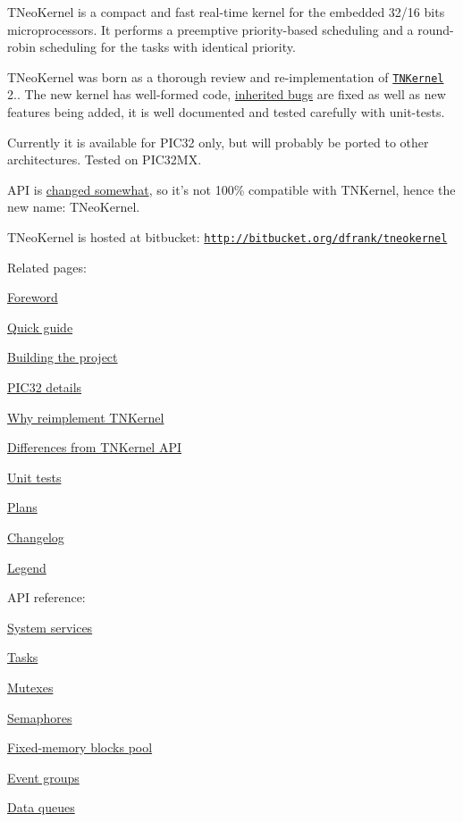 T\+Neo\+Kernel is a compact and fast real-\/time kernel for the embedded 32/16 bits microprocessors. It performs a preemptive priority-\/based scheduling and a round-\/robin scheduling for the tasks with identical priority.

T\+Neo\+Kernel was born as a thorough review and re-\/implementation of \href{http://tnkernel.com}{\tt T\+N\+Kernel} 2.. The new kernel has well-\/formed code, \hyperlink{why_reimplement_why_reimplement__bugs}{inherited bugs} are fixed as well as new features being added, it is well documented and tested carefully with unit-\/tests.

Currently it is available for P\+I\+C32 only, but will probably be ported to other architectures. Tested on P\+I\+C32\+M\+X.

A\+P\+I is \hyperlink{tnkernel_diff}{changed somewhat}, so it's not 100\% compatible with T\+N\+Kernel, hence the new name\+: T\+Neo\+Kernel.

T\+Neo\+Kernel is hosted at bitbucket\+: \href{http://bitbucket.org/dfrank/tneokernel}{\tt http\+://bitbucket.\+org/dfrank/tneokernel}

Related pages\+:


\begin{DoxyItemize}
\item \hyperlink{foreword}{Foreword}
\item \hyperlink{quick_guide}{Quick guide}
\item \hyperlink{building}{Building the project}
\item \hyperlink{pic32_details}{P\+I\+C32 details}
\item \hyperlink{why_reimplement}{Why reimplement T\+N\+Kernel}
\item \hyperlink{tnkernel_diff}{Differences from T\+N\+Kernel A\+P\+I}
\item \hyperlink{unit_tests}{Unit tests}
\item \hyperlink{plans}{Plans}
\item \hyperlink{changelog}{Changelog}
\item \hyperlink{legend}{Legend}
\end{DoxyItemize}

A\+P\+I reference\+:


\begin{DoxyItemize}
\item \hyperlink{tn__sys_8h}{System services}
\item \hyperlink{tn__tasks_8h}{Tasks}
\item \hyperlink{tn__mutex_8h}{Mutexes}
\item \hyperlink{tn__sem_8h}{Semaphores}
\item \hyperlink{tn__fmem_8h}{Fixed-\/memory blocks pool}
\item \hyperlink{tn__eventgrp_8h}{Event groups}
\item \hyperlink{tn__dqueue_8h}{Data queues} 
\end{DoxyItemize}